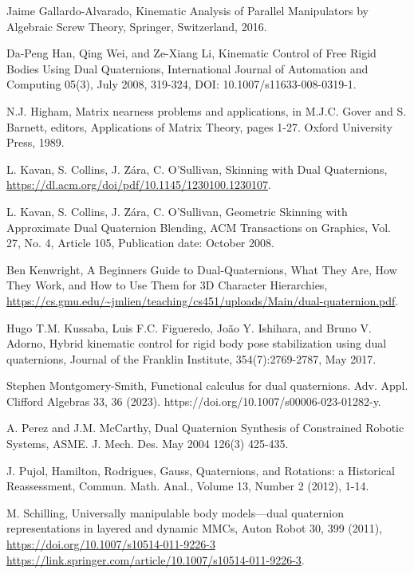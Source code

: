 \documentclass[reqno,12pt]{amsart}
\begin{document}
\begin{thebibliography}{99}
 Jaime Gallardo-Alvarado, Kinematic Analysis of Parallel Manipulators by Algebraic Screw Theory, Springer, Switzerland, 2016.

 Da-Peng Han, Qing Wei, and Ze-Xiang Li, Kinematic Control of Free Rigid Bodies Using Dual Quaternions, International Journal of Automation and Computing
05(3), July 2008, 319-324, DOI: 10.1007/s11633-008-0319-1.

 N.J. Higham, Matrix nearness problems and applications, in M.J.C. Gover and S. Barnett, editors, Applications of Matrix Theory, pages 1-27. Oxford University Press, 1989.

 L. Kavan, S. Collins, J. \u Z\'ara, C. O'Sullivan, Skinning with Dual Quaternions, \url{https://dl.acm.org/doi/pdf/10.1145/1230100.1230107}.

 L. Kavan, S. Collins, J. \u Z\'ara, C. O'Sullivan, Geometric Skinning with Approximate Dual Quaternion Blending, ACM Transactions on Graphics, Vol. 27, No. 4, Article 105, Publication date: October 2008.

 Ben Kenwright, A Beginners Guide to Dual-Quaternions, What They Are, How They Work, and How to Use Them for 3D Character Hierarchies, \url{https://cs.gmu.edu/~jmlien/teaching/cs451/uploads/Main/dual-quaternion.pdf}.

 Hugo T.M. Kussaba, Luis F.C. Figueredo, Jo\~ao Y. Ishihara, and Bruno V. Adorno, Hybrid kinematic control for rigid body pose stabilization using dual quaternions, Journal of the Franklin Institute, 354(7):2769-2787, May 2017.

 Stephen Montgomery-Smith, Functional calculus for dual quaternions. Adv. Appl. Clifford Algebras 33, 36 (2023). https://doi.org/10.1007/s00006-023-01282-y.

 A. Perez and J.M. McCarthy, Dual Quaternion Synthesis of Constrained Robotic Systems, ASME. J. Mech. Des. May 2004 126(3) 425-435.

 J. Pujol, Hamilton, Rodrigues, Gauss, Quaternions, and Rotations: a Historical Reassessment, Commun. Math. Anal., Volume 13, Number 2 (2012), 1-14.

  M. Schilling, Universally manipulable body models---dual quaternion representations in layered and dynamic MMCs, Auton Robot 30, 399 (2011), \url{https://doi.org/10.1007/s10514-011-9226-3 https://link.springer.com/article/10.1007/s10514-011-9226-3}.


\end{thebibliography}
\end{document}
